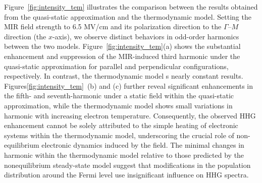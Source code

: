 Figure~\ref{fig:intensity_tem} illustrates the comparison between the results obtained from the quasi-static approximation and the thermodynamic model. Setting the MIR field strength to 6.5 MV/cm and its polarization direction to the $\Gamma$--$M$ direction (the $x$-axis), we observe distinct behaviors in odd-order harmonics between the two models. Figure~\ref{fig:intensity_tem}(a) shows the substantial enhancement and suppression of the MIR-induced third harmonic under the quasi-static approximation for parallel and perpendicular configurations, respectively. In contrast, the thermodynamic model s nearly constant results. Figures\ref{fig:intensity_tem}~(b) and (c) further reveal significant enhancements in the fifth- and seventh-harmonic under a static field within the quasi-static approximation, while the thermodynamic model shows small variations in harmonic with increasing electron temperature. Consequently, the observed HHG enhancement cannot be solely attributed to the simple heating of electronic systems within the thermodynamic model, underscoring the crucial role of non-equilibrium electronic dynamics induced by the field. The minimal changes in harmonic within the thermodynamic model relative to those predicted by the nonequilibrium steady-state model suggest that modifications in the population distribution around the Fermi level use insignificant influence on HHG spectra.
